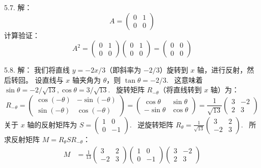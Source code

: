 \begin{exer}
5.7. 解：
$$ A = \begin{pmatrix} 0 & 1 \\ 0 & 0 \end{pmatrix} $$
计算验证：
$$ A^2 = \begin{pmatrix} 0 & 1 \\ 0 & 0 \end{pmatrix} \begin{pmatrix} 0 & 1 \\ 0 & 0 \end{pmatrix} = \begin{pmatrix} 0 & 0 \\ 0 & 0 \end{pmatrix} $$

5.8. 解：
我们将直线 $y = -2x/3$（即斜率为 $-2/3$）旋转到 $x$ 轴，进行反射，然后转回。
设直线与 $x$ 轴夹角为 $\theta$，则 $\tan\theta = -2/3$.~
这意味着 $\sin\theta = -2/\sqrt{13}, \cos\theta = 3/\sqrt{13}$.~
旋转矩阵 $R_{-\theta}$（将直线转到 $x$ 轴）为：
$$ R_{-\theta} = \begin{pmatrix} \cos(-\theta) & -\sin(-\theta) \\ \sin(-\theta) & \cos(-\theta) \end{pmatrix} = \begin{pmatrix} \cos\theta & \sin\theta \\ -\sin\theta & \cos\theta \end{pmatrix} = \frac{1}{\sqrt{13}} \begin{pmatrix} 3 & -2 \\ 2 & 3 \end{pmatrix} $$
关于 $x$ 轴的反射矩阵为 $S = \begin{pmatrix} 1 & 0 \\ 0 & -1 \end{pmatrix}$.~
逆旋转矩阵 $R_\theta = \frac{1}{\sqrt{13}} \begin{pmatrix} 3 & 2 \\ -2 & 3 \end{pmatrix}$.~
所求反射矩阵 $M = R_\theta S R_{-\theta}$：
$$
\begin{aligned}
M &= \frac{1}{13} \begin{pmatrix} 3 & 2 \\ -2 & 3 \end{pmatrix} \begin{pmatrix} 1 & 0 \\ 0 & -1 \end{pmatrix} \begin{pmatrix} 3 & -2 \\ 2 & 3 \end{pmatrix} \\

\end{aligned}$$
\end{exer}
